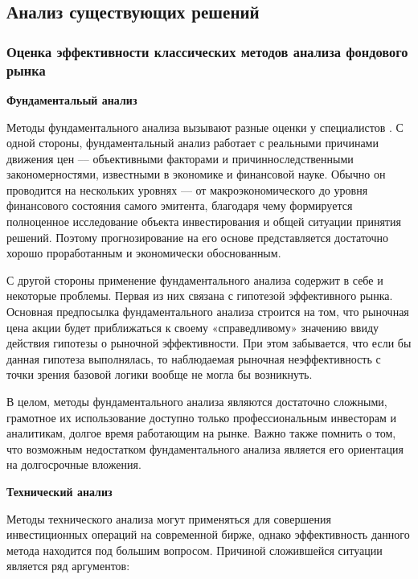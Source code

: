 \subsection{Анализ существующих решений}





\subsubsection{Оценка эффективности классических методов анализа фондового рынка}



\textbf{Фундаментальый анализ}

\par Методы фундаментального анализа вызывают разные оценки у специалистов \cite{classic-eff}. С одной стороны, фундаментальный анализ работает с реальными причинами движения цен –-- объективными факторами и причинноследственными закономерностями, известными в экономике и финансовой
науке. Обычно он проводится на нескольких уровнях –-- от макроэкономического до
уровня финансового состояния самого эмитента, благодаря чему формируется полноценное исследование объекта инвестирования и общей ситуации
принятия решений. Поэтому прогнозирование на его основе представляется
достаточно хорошо проработанным и экономически обоснованным.

\par С другой стороны применение фундаментального анализа содержит в себе и некоторые проблемы. Первая из них связана с гипотезой эффективного рынка. Основная предпосылка фундаментального анализа строится на том, что рыночная цена акции будет приближаться к своему «справедливому» значению ввиду действия гипотезы о рыночной эффективности. При этом забывается, что если бы данная гипотеза выполнялась, то наблюдаемая рыночная неэффективность с точки зрения базовой логики вообще не могла бы возникнуть.

\par В целом, методы фундаментального анализа являются достаточно
сложными, грамотное их использование доступно только профессиональным инвесторам и аналитикам, долгое время работающим на рынке. Важно также помнить о том, что возможным недостатком фундаментального анализа является его ориентация на долгосрочные вложения. 

\textbf{Технический анализ}

\par Методы технического анализа могут применяться для совершения
инвестиционных операций на современной бирже, однако эффективность данного метода находится под большим вопросом. \cite{classic-eff} Причиной сложившейся ситуации является ряд аргументов:

